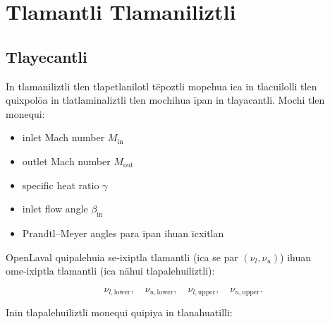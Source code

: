 \chapter{Tlamantli Tlamaniliztli}
\begin{abstract}

Inin amatl tlatlaçotla in tlamaniliztli para in tlapetlanilotl
tēpoztli ātlacualoyan, tlen mochihua ica in tlatlaminaliztli
ihuan in tlatlapaliztli tlen āyōtl.
Inin tlamaniliztli OpenLaval quipalehuia in tlamaniliztli
ica ome īxiptla: tlen se tlamantli (symmetric) ihuan tlen
ome‑ixiptla (asymmetric), in tlen quipiya in Prandtl–Meyer
tlapalehuiliztli para īpan ihuan īcxitlan in ātlacualoyan.

Ipan in ome‑ixiptla tlamantli, in īpan ihuan īcxitlan
mopalehuiya ica ahmo se tlamantli tlatlapaliztli,
huan yeh inin quichihua in R$^\ast$ ahmo se,
in tlatlapaliztli ahmo se, ihuan in tlatzintla‑tlacuilolli
ahmo se. Inin amatl quipohua in tlamantli tlen
OpenLaval quichihua axcan.

\end{abstract}

\section{Tlayecantli}

In tlamaniliztli tlen tlapetlanilotl tēpoztli
mopehua ica in tlacuilolli tlen quixpolōa in tlatlaminaliztli
tlen mochihua īpan in tlayacantli.
Mochi tlen monequi:

\begin{itemize}
  \item inlet Mach number $M_{\mathrm{in}}$
  \item outlet Mach number $M_{\mathrm{out}}$
  \item specific heat ratio $\gamma$
  \item inlet flow angle $\beta_{\mathrm{in}}$
  \item Prandtl–Meyer angles para īpan ihuan īcxitlan
\end{itemize}

OpenLaval quipalehuia se‑ixiptla tlamantli
(ica se par $(\nu_l, \nu_u)$)
ihuan ome‑ixiptla tlamantli
(ica nāhui tlapalehuiliztli):



\[
\nu_{l,\mathrm{lower}},\quad
\nu_{u,\mathrm{lower}},\quad
\nu_{l,\mathrm{upper}},\quad
\nu_{u,\mathrm{upper}}.
\]



Inin tlapalehuiliztli monequi quipiya in tlanahuatilli:



